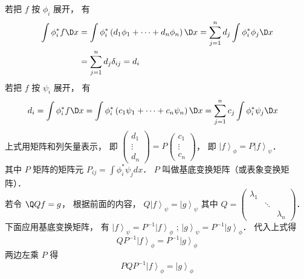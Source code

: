 若把 $f$ 按 ${\phi_i}$ 展开， 有
\begin{equation}
\begin{aligned}
\int {\phi_i^*f   \D x} & = \int {\phi_i^*\left( {{d_1}{\phi_1} + \dots + {d_n}{\phi_n}} \right)   \D x}  = \sum\limits_{j = 1}^n {d_j} \int {\phi_i^*{\phi_j} \D x}  \\
&= \sum\limits_{j = 1}^n {d_j} {\delta_{ij}} = {d_i}
\end{aligned}
\end{equation}
若把 $f$ 按 $\psi_i$ 展开， 有
\begin{equation}
\begin{aligned}
{d_i} & = \int {\phi_i^*f   \D x}   = \int {\phi_i^*\left( {{c_1}{\psi_1} + \dots + {c_n}{\psi_n}} \right)   \D x} = \sum\limits_{j = 1}^n {c_j} \int {\phi_i^*{\psi_j} \D x}
\end{aligned}
\end{equation}
上式用矩阵和列矢量表示， 即 $\left( {\begin{aligned}
{d_1}\\
 \vdots \\
{d_n}
\end{aligned}} \right) = P\left( {\begin{aligned}
{c_1}\\
 \vdots \\
{c_n}
\end{aligned}} \right)$，  即 ${\left| f \right\rangle_\phi } = P{\left| f \right\rangle_\psi }$．\\
其中 $P$ 矩阵的矩阵元 ${P_{ij}} = \int {\phi_i^*{\psi_j}dx} $．  $P$ 叫做基底变换矩阵（或表象变换矩阵）．\\
若令 $\Q Q f = g$，  根据前面的内容， $Q{\left| f \right\rangle_\psi } = {\left| g \right\rangle_\psi }$ 其中 $Q = \left( {\begin{aligned}
{\lambda_1}&{}&{}\\
{}& \ddots &{}\\
{}&{}&{\lambda_n}
\end{aligned}} \right)$． \\
下面应用基底变换矩阵， 有 ${\left| f \right\rangle_\psi } = {P^{ - 1}}{\left| f \right\rangle_\phi }$ ; ${\left| g \right\rangle_\psi } = {P^{ - 1}}{\left| g \right\rangle_\phi }$． 代入上式得
\begin{equation}
  Q{P^{ - 1}}{\left| f \right\rangle_\phi } = {P^{ - 1}}{\left| g \right\rangle_\phi }
\end{equation}
两边左乘 $P$ 得
\begin{equation}
  PQ{P^{ - 1}}{\left| f \right\rangle_\phi } = {\left| g \right\rangle_\phi }
\end{equation}
